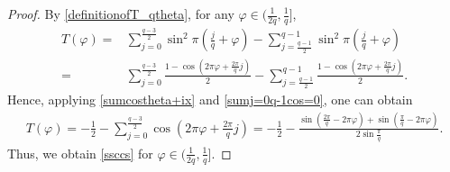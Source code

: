 \documentclass[10pt,a4paper]{amsart}
\begin{document}
\begin{proof}
		 By \eqref{definitionofT_qtheta}, for any $\varphi\in \Big(\frac{1}{2q},\frac{1}{q}\Big]$,
		\begin{align}
			T(\varphi)=&\sum_{j=0}^{\frac{q-3}{2}}\sin^2\pi\left(\frac{j}{q}+\varphi\right )-\sum_{j=\frac{q-1}{2}}^{q-1}\sin^2\pi\left(\frac{j}{q}+\varphi\right)\nonumber\\
			=&\sum_{j=0}^{\frac{q-3}{2}}\frac{1-\cos\left(2\pi\varphi+\frac{2\pi}{q}j\right)}{2}-\sum_{j=\frac{q-1}{2}}^{{q-1}}\frac{1-\cos\left(2\pi\varphi+\frac{2\pi}{q}j\right)}{2}\nonumber.
		\end{align}
		Hence, applying \eqref{sumcostheta+ix} and \eqref{sumj=0q-1cos=0}, one can obtain 
		\begin{align}
			T(\varphi)=-\frac{1}{2}-\sum_{j=0}^{\frac{q-3}{2}}\cos\left(2\pi\varphi+\frac{2\pi}{q}j\right)=-\frac{1}{2}-\frac{\sin\left(\frac{2\pi}{q}-2\pi\varphi\right)+\sin\left(\frac{\pi}{q}-2\pi\varphi\right)}{2\sin\frac{\pi}{q}}.\nonumber
		\end{align}
		Thus, we obtain \eqref{ssccs} for $\varphi\in\Big(\frac{1}{2q},\frac{1}{q}\Big].$
	\end{proof}
\end{document}
